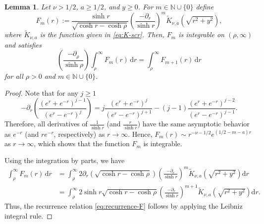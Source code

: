 \documentclass[11pt]{amsart}
\theoremstyle{plain}
\newtheorem{lemma}[theorem]{Lemma}
\theoremstyle{definition}
\numberwithin{equation}{section}
\begin{document}
\begin{lemma} \label{lem:recurrence}
Let $\nu > 1/2$, $a \geq 1/2$, and $y \geq 0$. For $m \in \mathbb{N} \cup \lbrace 0 \rbrace$ define
\begin{equation*}
F_{m}(r) := \frac{\sinh r}{\sqrt{\cosh r - \cosh\rho}} \left( \frac{-\partial_{r}}{\sinh r} \right)^{m} \widetilde{K}_{\nu, a}\left( \sqrt{r^{2}+y^{2}} \right),
\end{equation*}
where $\widetilde{K}_{\nu, a}$ is the function given in \eqref{eq:K-scr}. Then, $F_{m}$ is integrable on $(\rho, \infty)$ and satisfies
\begin{equation} \label{eq:recurrence-F}
\left( \frac{-\partial_{\rho}}{\sinh \rho} \right) \int_{\rho}^{\infty} F_{m}(r) \,\mathrm{d}r = \int_{\rho}^{\infty} F_{m+1}(r) \,\mathrm{d}r
\end{equation}
for all $\rho>0$ and $m \in \mathbb{N} \cup \lbrace 0 \rbrace$.
\end{lemma}

\begin{proof}
Note that for any $j \geq 1$
\begin{equation*}
-\partial_{r} \left( \frac{(e^{r}+e^{-r})^{j-1}}{(e^{r}-e^{-{r}})^{j}} \right) = j\frac{(e^{r}+e^{-r})^{j}}{(e^{r}-e^{-r})^{j+1}} - (j-1)\frac{(e^{r}+e^{-r})^{j-2}}{(e^{r}-e^{-r})^{j-1}}.
\end{equation*}
Therefore, all derivatives of $\frac{1}{\sinh r}$ (and $\frac{r}{\sinh r}$) have the same asymptotic behavior as $e^{-r}$ (and $re^{-r}$, respectively) as $r \to \infty$. Hence, $F_{m}(r) \sim r^{-\nu-1/2}e^{(1/2-m-a)r}$ as $r \to \infty$, which shows that the function $F_{m}$ is integrable.

Using the integration by parts, we have
\begin{equation*}
\begin{split}
\int_{\rho}^{\infty} F_{m}(r) \,\mathrm{d}r
&= \int_{\rho}^{\infty} 2\partial_{r} \left( \sqrt{\cosh r - \cosh \rho} \right) \left( \frac{-\partial_r}{\sinh r} \right)^{m} \widetilde{K}_{\nu, a} \left( \sqrt{r^{2}+y^{2}} \right)\mathrm{d}r \\
&= \int_{\rho}^{\infty} 2 \sinh r \sqrt{\cosh r - \cosh \rho} \left( \frac{-\partial_{r}}{\sinh r} \right)^{m+1} \widetilde{K}_{\nu, a} \left( \sqrt{r^{2}+y^{2}} \right)\mathrm{d}r.
\end{split}
\end{equation*}
Thus, the recurrence relation \eqref{eq:recurrence-F} follows by applying the Leibniz integral rule.
\end{proof}
\end{document}
